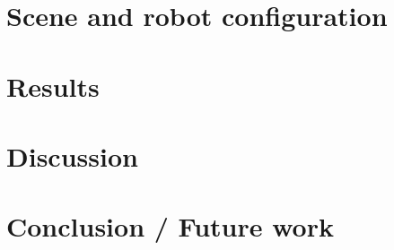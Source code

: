 \documentclass[10pt,journal,compsoc]{IEEEtran}
\begin{document}
\section{Scene and robot configuration}


\section{Results}


\section{Discussion}


\section{Conclusion / Future work}



\end{document}
